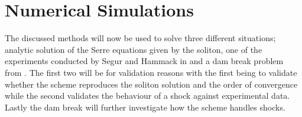 \documentclass[SingleSpace,12pt]{Serre_ASCE}
\begin{document}
\section{Numerical Simulations}
\label{section:Numerical Simulations}
The discussed methods will now be used to solve three different situations; analytic solution of the Serre equations given by the soliton, one of the experiments conducted by Segur and Hammack in \cite{Hammack-Segur-1978-337} and a dam break problem from \cite{El-etal-2006,Hank-etal-2010-2034}. The first two will be for validation reasons with the first being to validate whether the scheme reproduces the soliton solution and the order of convergence while the second validates the behaviour of a shock against experimental data. Lastly the dam break will further investigate how the scheme handles shocks. 
\end{document}
